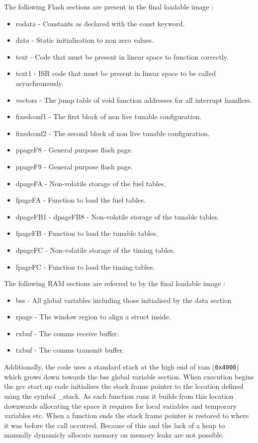 \documentclass[12pt,a4paper,titlepage]{article}
\begin{document}
\begin{titlepage}
\begin{center}
The following Flash sections are present in the final loadable image :


\begin{itemize}
\item rodata - Constants as declared with the const keyword.
\item data - Static initialisation to non zero values.
\item text - Code that must be present in linear space to function correctly.
\item text1 - ISR code that must be present in linear space to be called asynchronously.
\item vectors - The jump table of void function addresses for all interrupt handlers.
\item fixedconf1 - The first block of non live tunable configuration.
\item fixedconf2 - The second block of non live tunable configuration.
\item ppageF8 - General purpose flash page.
\item ppageF9 - General purpose flash page.
\item dpageFA - Non-volatile storage of the fuel tables.
\item fpageFA - Function to load the fuel tables.
\item dpageFB1 - dpageFB8 - Non-volatile storage of the tunable tables.
\item fpageFB - Function to load the tunable tables.
\item dpageFC - Non-volatile storage of the timing tables.
\item fpageFC - Function to load the timing tables.
\end{itemize}

The following RAM sections are referred to by the final loadable image :

\begin{itemize}
\item bss - All global variables including those initialised by the data section
\item rpage - The window region to align a struct inside.
\item rxbuf - The comms receive buffer.
\item txbuf - The comms transmit buffer.
\end{itemize}


Additionally, the code uses a standard stack at the high end of ram (\texttt{0x4000}) which grows down towards the bss global variable section. When execution begins the gcc start up code initialises the stack frame pointer to the location defined using the symbol \_stack. As each function runs it builds from this location downwards allocating the space it requires for local variables and temporary variables etc. When a function ends the stack frame pointer is restored to where it was before the call occurred. Because of this and the lack of a heap to manually dynamicly allocate memory on memory leaks are not possible.





\end{center}
\end{titlepage}
\end{document}
